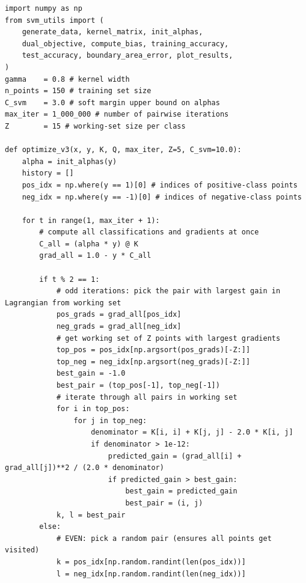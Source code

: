 \documentclass[11pt]{article}
\theoremstyle{mystyle}
\begin{document}
 \begin{verbatim}
import numpy as np
from svm_utils import (
    generate_data, kernel_matrix, init_alphas,
    dual_objective, compute_bias, training_accuracy,
    test_accuracy, boundary_area_error, plot_results,
)
gamma    = 0.8 # kernel width
n_points = 150 # training set size
C_svm    = 3.0 # soft margin upper bound on alphas
max_iter = 1_000_000 # number of pairwise iterations
Z        = 15 # working-set size per class

def optimize_v3(x, y, K, Q, max_iter, Z=5, C_svm=10.0):
    alpha = init_alphas(y)
    history = []
    pos_idx = np.where(y == 1)[0] # indices of positive-class points
    neg_idx = np.where(y == -1)[0] # indices of negative-class points

    for t in range(1, max_iter + 1):
        # compute all classifications and gradients at once
        C_all = (alpha * y) @ K
        grad_all = 1.0 - y * C_all

        if t % 2 == 1:
            # odd iterations: pick the pair with largest gain in Lagrangian from working set
            pos_grads = grad_all[pos_idx]
            neg_grads = grad_all[neg_idx]
            # get working set of Z points with largest gradients
            top_pos = pos_idx[np.argsort(pos_grads)[-Z:]]
            top_neg = neg_idx[np.argsort(neg_grads)[-Z:]]
            best_gain = -1.0
            best_pair = (top_pos[-1], top_neg[-1])
            # iterate through all pairs in working set
            for i in top_pos:
                for j in top_neg:
                    denominator = K[i, i] + K[j, j] - 2.0 * K[i, j]
                    if denominator > 1e-12:
                        predicted_gain = (grad_all[i] + grad_all[j])**2 / (2.0 * denominator)
                        if predicted_gain > best_gain:
                            best_gain = predicted_gain
                            best_pair = (i, j)
            k, l = best_pair
        else:
            # EVEN: pick a random pair (ensures all points get visited)
            k = pos_idx[np.random.randint(len(pos_idx))]
            l = neg_idx[np.random.randint(len(neg_idx))]


\end{verbatim}
\end{document}

